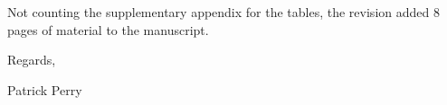 \documentclass[12pt,letterpaper]{article}
\begin{document}
Not counting the supplementary appendix for the tables, the revision added
8 pages of material to the manuscript.


\vspace{1\baselineskip}

\noindent
Regards,


\vspace{4\baselineskip}
\noindent
Patrick Perry

\end{document}
